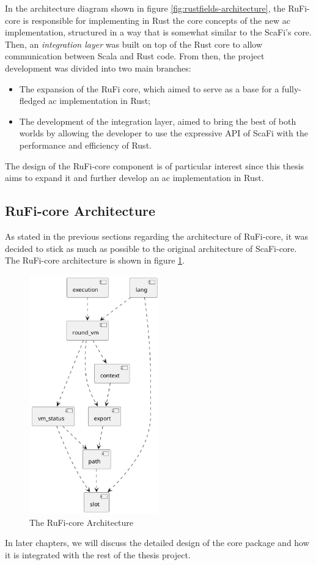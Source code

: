 In the architecture diagram shown in figure \ref{fig:rustfields-architecture}, the RuFi-core is responsible for implementing in Rust the core concepts of the new \ac{ac} implementation,
structured in a way that is somewhat similar to the ScaFi's core. Then, an \textit{integration layer} was built on top of the Rust core to allow communication
between Scala and Rust code. From then, the project development was divided into two main branches:
\begin{itemize}
    \item The expansion of the RuFi core, which aimed to serve as a base for a fully-fledged \ac{ac} implementation in Rust;
    \item The development of the integration layer, aimed to bring the best of both worlds by allowing the developer to use the expressive API of ScaFi with the performance and efficiency of Rust.
\end{itemize}

The design of the RuFi-core component is of particular interest since this thesis aims to expand it and further develop an \ac{ac} implementation in Rust.

\subsection{RuFi-core Architecture}
As stated in the previous sections regarding the architecture of RuFi-core, it was decided to stick as much as possible to the original architecture of ScaFi-core.
The RuFi-core architecture is shown in figure \ref{fig:rufi-core-architecture}.

\begin{figure}[h]
    \centering
    \includegraphics[width=0.5\textwidth]{figures/diagrams/img/rufi-core-architecture.png}
    \caption{The RuFi-core Architecture}
    \label{fig:rufi-core-architecture}
\end{figure}

In later chapters, we will discuss the detailed design of the core package and how it is integrated with the rest of the thesis project.